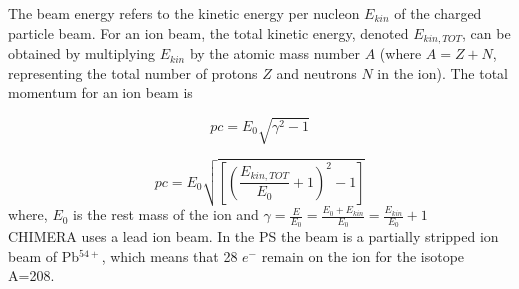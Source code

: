 \documentclass{cernatsnote}
\begin{document}
The beam energy refers to the kinetic energy per nucleon $E_{kin}$ of the charged particle beam. For an ion beam, the total kinetic energy, denoted $E_{kin, TOT}$, can be obtained by multiplying $E_{kin}$ by the atomic mass number $A$ (where $A = Z + N$, representing the total number of protons $Z$ and neutrons $N$ in the ion).  The total momentum for an ion beam is \cite{chao_handbook_2013}

$$pc={E_{0}\sqrt{\gamma^{2}-1}}$$

$$pc = E_{0}\sqrt{\left [ \left( \frac{E_{kin, TOT}}{E_{0}}+1\right )^{2}-1\right ]}$$
where, $E_{0}$ is the rest mass of the ion and $\gamma=\frac{E}{E_{0}}=\frac{E_{0}+E_{kin}}{E_{0}} = \frac{E_{kin}}{E_{0}}+1$
\\

CHIMERA uses a lead ion beam. In the PS the beam is a partially stripped ion beam of Pb$^{54+}$, which means that 28 $e^{-}$ remain on the ion for the isotope A=208.
\\
\end{document}

